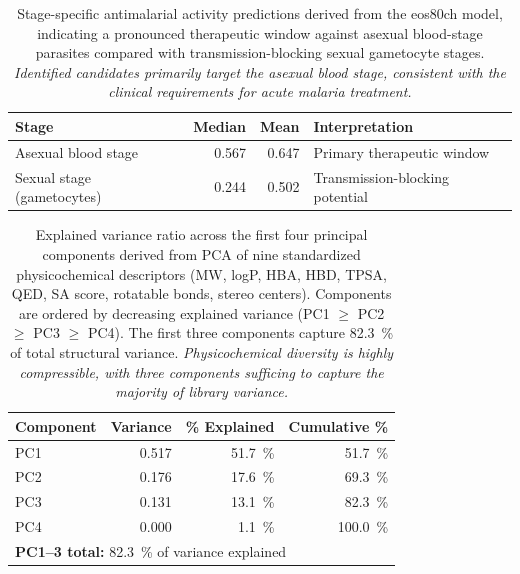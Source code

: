 \documentclass[journal=jcisd8,manuscript=suppinfo]{achemso}
\begin{document}
\begin{table}[htbp]
\centering
\caption{Stage-specific antimalarial activity predictions derived from the eos80ch model, indicating a pronounced therapeutic window against asexual blood-stage parasites compared with transmission-blocking sexual gametocyte stages. \textit{Identified candidates primarily target the asexual blood stage, consistent with the clinical requirements for acute malaria treatment.}}
\label{tab:stage_activity}
\begin{tabular}{@{}l r r l@{}}
\toprule
\textbf{Stage} & \textbf{Median} & \textbf{Mean} & \textbf{Interpretation} \\
\midrule
Asexual blood stage & \num{0.567} & \num{0.647} & Primary therapeutic window \\
Sexual stage (gametocytes) & \num{0.244} & \num{0.502} & Transmission-blocking potential \\
\bottomrule
\end{tabular}
\end{table}

\begin{table}[htbp]
\centering
\caption{Explained variance ratio across the first four principal components derived from PCA of nine standardized physicochemical descriptors (MW, logP, HBA, HBD, TPSA, QED, SA score, rotatable bonds, stereo centers). Components are ordered by decreasing explained variance (PC1 $\geq$ PC2 $\geq$ PC3 $\geq$ PC4). The first three components capture \qty{82.3}{\percent} of total structural variance. \textit{Physicochemical diversity is highly compressible, with three components sufficing to capture the majority of library variance.}}
\label{tab:pca}
\begin{tabular}{@{}l r r r@{}}
\toprule
\textbf{Component} & \textbf{Variance} & \textbf{\unit{\percent} Explained} & \textbf{Cumulative \unit{\percent}} \\
\midrule
PC1 & \num{0.517} & \qty{51.7}{\percent} & \qty{51.7}{\percent} \\
PC2 & \num{0.176} & \qty{17.6}{\percent} & \qty{69.3}{\percent} \\
PC3 & \num{0.131} & \qty{13.1}{\percent} & \qty{82.3}{\percent} \\
PC4 & \num{0.000} & \qty{1.1}{\percent} & \qty{100.0}{\percent} \\
\midrule
\multicolumn{4}{l}{\textbf{PC1--3 total:} \qty{82.3}{\percent} of variance explained} \\
\bottomrule
\end{tabular}
\end{table}
\end{document}
